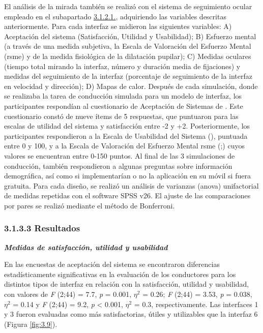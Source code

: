 El análisis de la mirada también se realizó con el sistema de seguimiento ocular empleado en el subapartado \hyperref[3121]{3.1.2.1.}, adquiriendo las variables descritas anteriormente. 
Para cada interfaz se midieron las siguientes variables: A) Aceptación del sistema (Satisfacción, Utilidad y Usabilidad); B) Esfuerzo mental (a través de una medida subjetiva, la Escala de Valoración del Esfuerzo Mental (\gls{rsme}) y de la medida fisiológica de la dilatación pupilar); C) Medidas oculares (tiempo total mirando la interfaz, número y duración media de fijaciones) y medidas del seguimiento de la interfaz (porcentaje de seguimiento de la interfaz en velocidad y dirección); D) Mapas de calor.
Después de cada simulación, donde se realizaba la tarea de conducción simulada para un modelo de interfaz, los participantes respondían al cuestionario de Aceptación de Sistemas de \textcite{vanderlaan}. Este cuestionario constó de nueve ítems de 5 respuestas, que puntuaron para las escalas de utilidad del sistema y satisfacción entre -2 y +2. Posteriormente, los participantes respondieron a la Escala de Usabilidad del Sistema (\cite{brooke}), puntuada entre 0 y 100, y a la Escala de Valoración del Esfuerzo Mental \gls{rsme} (\cite{zijlstra};) cuyos valores se encuentran entre 0-150 puntos. Al final de las 3 simulaciones de conducción, también respondieron a algunas preguntas sobre información demográfica, así como si implementarían o no la aplicación en su móvil si fuera gratuita. 
Para cada diseño, se realizó un análisis de varianzas (\gls{anova}) unifactorial de medidas repetidas con el software SPSS v26. El ajuste de las comparaciones por pares se realizó mediante el método de Bonferroni. 

\subsubsection{3.1.3.3 Resultados}\label{3133}

\textbf{\emph{Medidas de satisfacción, utilidad y usabilidad}}

En las encuestas de aceptación del sistema se encontraron diferencias estadísticamente significativas en la evaluación de los conductores para los distintos tipos de interfaz en relación con la satisfacción, utilidad y usabilidad, con valores de \emph{F} (2;44) = 7.7, \emph{p} = 0.001, $\eta^2$ = 0.26; \emph{F} (2;44) = 3.53, \emph{p} = 0.038, $\eta^2$ = 0.14 y \emph{F} (2;44) = 9.2, \emph{p} < 0.001, $\eta^2$ = 0.3, respectivamente. Las interfaces 1 y 3 fueron evaluadas como más satisfactorias, útiles y utilizables que la interfaz 6 (Figura \ref{fig:3.9}).

